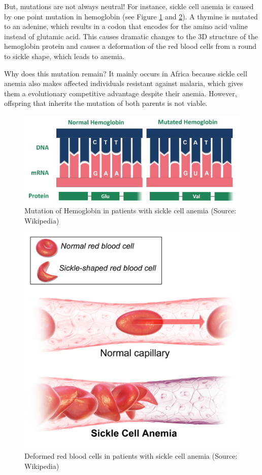 \documentclass[
  11pt,
]{book}
\begin{document}
But, mutations are not always neutral! For instance, sickle cell anemia is caused by one point mutation in hemoglobin (see Figure \ref{fig:sickleCell1} and \ref{fig:sickleCell2}). A thymine is mutated to an adenine, which results in a codon that encodes for the amino acid valine instead of glutamic acid. This causes dramatic changes to the 3D structure of the hemoglobin protein and causes a deformation of the red blood cells from a round to sickle shape, which leads to anemia.

Why does this mutation remain? It mainly occurs in Africa because sickle cell anemia also makes affected individuals resistant against malaria, which gives them a evolutionary competitive advantage despite their anemia. However, offspring that inherits the mutation of both parents is not viable.

\begin{figure}

{\centering \includegraphics[width=0.45\linewidth]{./figs/sickleCellWikipedia2} 

}

\caption{Mutation of Hemoglobin in patients with sickle cell anemia (Source: Wikipedia)}\label{fig:sickleCell1}
\end{figure}

\begin{figure}

{\centering \includegraphics[width=0.45\linewidth]{./figs/Sickle_Cell_Anemia_wiki3} 

}

\caption{Deformed red blood cells in patients with sickle cell anemia (Source: Wikipedia)}\label{fig:sickleCell2}
\end{figure}
\end{document}
